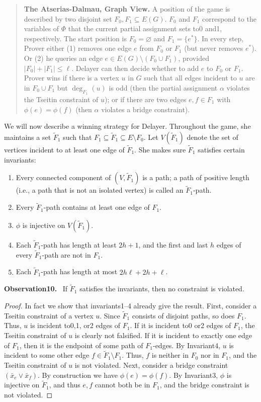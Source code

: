 \documentclass[10pt,a4paper]{article}
\newenvironment{authorclaim}[1]{\par\medskip\noindent\textbf{#1.}\ \ignorespaces}{\par\medskip}
\begin{document}
\begin{quote}
\textbf{The Atserias-Dalmau, Graph View.} A position of the game is described by two disjoint set $F_0,F_1\subseteq E(G)$. $F_0$ and $F_1$ correspond to the variables of $\Phi$ that the current partial assignment sets to0 and1, respectively. The start position is $F_0=\varnothing$ and $F_1=\{e^*\}$.
In every step, Prover either (1) removes one edge $e$ from $F_0$ or $F_1$ (but never removes $e^*$). Or (2) he queries an edge $e\in E(G)\setminus(F_0\cup F_1)$, provided $|F_0|+|F_1|\le\ell$. Delayer can then decide whether to add $e$ to $F_0$ or $F_1$.
Prover wins if there is a vertex $u$ in $G$ such that all edges incident to $u$ are in $F_0\cup F_1$ but $\deg_{F_1}(u)$ is odd (then the partial assignment $\alpha$ violates the Tseitin constraint of $u$); or if there are two edges $e,f\in F_1$ with $\phi(e)=\phi(f)$ (then $\alpha$ violates a bridge constraint).
\end{quote}
We will now describe a winning strategy for Delayer. Throughout the game, she maintains a set $\widetilde F_1$ such that $F_1\subseteq\widetilde F_1\subseteq E\setminus F_0$. Let $V(\widetilde F_1)$ denote the set of vertices incident to at least one edge of $\widetilde F_1$. She makes sure $\widetilde F_1$ satisfies certain invariants:
\begin{enumerate}
\item Every connected component of $(V,\widetilde F_1)$ is a path; a path of positive length (i.e., a path that is not an isolated vertex) is called an $\widetilde F_1$-path.
\item Every $\widetilde F_1$-path contains at least one edge of $F_1$.
\item $\phi$ is injective on $V(\widetilde F_1)$.
\item Each $\widetilde F_1$-path has length at least $2h+1$, and the first and last $h$ edges of every $\widetilde F_1$-path are not in $F_1$.
\item Each $\widetilde F_1$-path has length at most $2h\ell+2h+\ell$.
\end{enumerate}
\begin{authorclaim}{Observation10}
If $\widetilde F_1$ satisfies the invariants, then no constraint is violated.
\end{authorclaim}
\begin{proof}
In fact we show that invariants1–4 already give the result. First, consider a Tseitin constraint of a vertex $u$. Since $\widetilde F_1$ consists of disjoint paths, so does $F_1$. Thus, $u$ is incident to0,1, or2 edges of $F_1$. If it is incident to0 or2 edges of $F_1$, the Tseitin constraint of $u$ is clearly not falsified. If it is incident to exactly one edge of $F_1$, then it is the endpoint of some path of $F_1$-edges. By Invariant4, $u$ is incident to some other edge $f\in\widetilde F_1\setminus F_1$. Thus, $f$ is neither in $F_0$ nor in $F_1$, and the Tseitin constraint of $u$ is not violated.
Next, consider a bridge constraint $(\bar x_e\vee\bar x_f)$. By construction we have $\phi(e)=\phi(f)$. By Invariant3, $\phi$ is injective on $\widetilde F_1$, and thus $e,f$ cannot both be in $F_1$, and the bridge constraint is not violated.
\end{proof}
\end{document}
